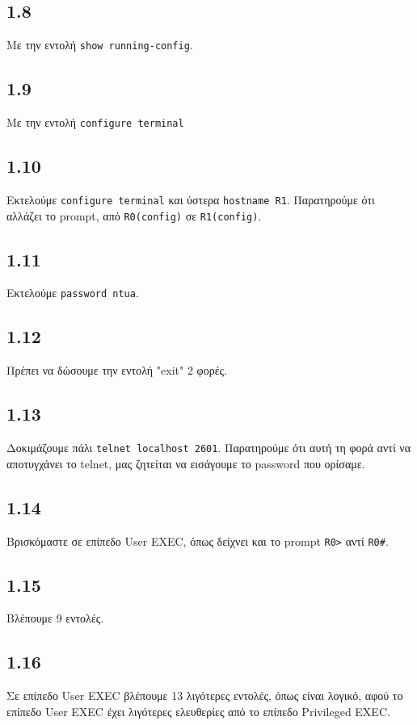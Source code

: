 \documentclass[a4paper, 12pt]{article}
\begin{document}
	\subsection*{1.8}
		Με την εντολή \verb|show running-config|.

	\subsection*{1.9}
		Με την εντολή \verb|configure terminal|

	\subsection*{1.10}
		Εκτελούμε \verb|configure terminal| και ύστερα \verb|hostname R1|. Παρατηρούμε ότι αλλάζει το prompt, από \verb|R0(config)| σε \verb|R1(config)|.
		
	\subsection*{1.11}
		Εκτελούμε \verb|password ntua|.

	\subsection*{1.12}
		Πρέπει να δώσουμε την εντολή "exit" 2 φορές.

	\subsection*{1.13}
		Δοκιμάζουμε πάλι \verb|telnet localhost 2601|. Παρατηρούμε ότι αυτή τη φορά αντί να αποτυγχάνει το telnet, μας ζητείται να εισάγουμε το password που ορίσαμε.

	\subsection*{1.14}
		Βρισκόμαστε σε επίπεδο User EXEC, όπως δείχνει και το prompt \verb|R0>| αντί \verb|R0#|.

	\subsection*{1.15}
		Βλέπουμε 9 εντολές.

	\subsection*{1.16}
		Σε επίπεδο User EXEC βλέπουμε 13 λιγότερες εντολές, όπως είναι λογικό, αφού το επίπεδο User EXEC έχει λιγότερες ελευθερίες από το επίπεδο Privileged EXEC. 
\end{document}
